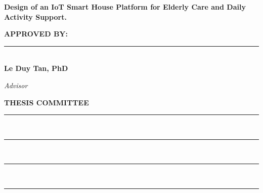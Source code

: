 \begin{titlepage}
\thispagestyle{empty}
\begin{center}

\vspace*{1.8cm}

\Large
\textbf{Design of an IoT Smart House Platform for Elderly Care and Daily Activity Support.}

\vspace{2.4cm}

\large
\textbf{APPROVED BY:}

\vspace{2.0cm}

\rule{8.4cm}{0.4pt}\\[0.55cm]
\Large\textbf{Le Duy Tan, PhD}

\vspace{0.15cm}
\Large\textit{Advisor}

\vspace{2.0cm}

\Large
\textbf{THESIS COMMITTEE}

\vspace{1.6cm}

\rule{8.4cm}{0.4pt}\\[1.0cm]
\rule{8.4cm}{0.4pt}\\[1.0cm]
\rule{8.4cm}{0.4pt}\\[1.0cm]
\rule{8.4cm}{0.4pt}


\end{center}
\end{titlepage}

